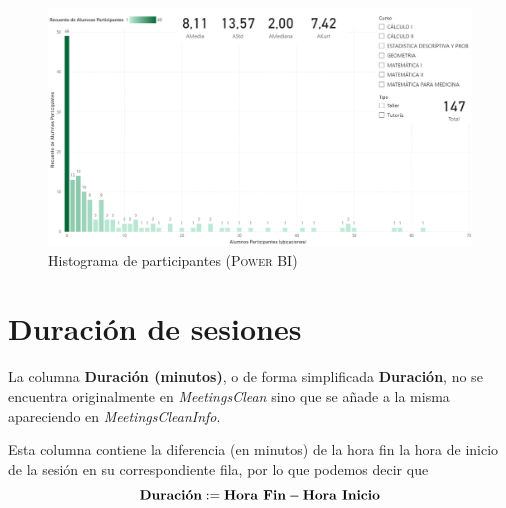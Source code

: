 \documentclass[11pt,a4paper]{book}
\theoremstyle{definition}%
\begin{document}
                \begin{figure}[H]
                    \centering
                    \includegraphics[width=1\textwidth]{Sources/histograma_ParticipantesGlobal.png}
                    \caption{Histograma de participantes (\textsc{Power BI})}
                    \label{fig:histograma_ParticipantesGlobal}
                \end{figure}
                
            \newpage
            \section{Duración de sesiones}
                La columna \textbf{Duración (minutos)}, o de forma simplificada \textbf{Duración}, no se encuentra originalmente en \textit{MeetingsClean} sino que se añade a la misma apareciendo en \textit{MeetingsCleanInfo}.
                
                Esta columna contiene la diferencia (en minutos) de la hora fin la hora de inicio de la sesión en su correspondiente fila, por lo que podemos decir que 
                \begin{equation*}
                    \textup{\textbf{Duración}}:=\textup{\textbf{Hora Fin}}-\textup{\textbf{Hora Inicio}}
                \end{equation*}
                
\end{document}
